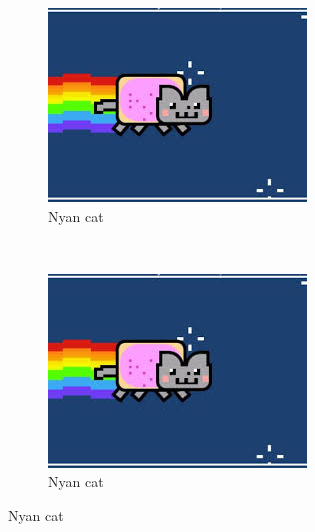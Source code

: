 \documentclass[../{{cookiecutter.project_slug}}.tex]{subfiles}
\begin{document}
    \begin{figure}
        \centering
        \begin{subfigure}[b]{0.3\textwidth}
            \includegraphics[width=\textwidth]{images/cat.jpeg}
            \caption{Nyan cat}
            \label{fig:cat1}
        \end{subfigure}%
        ~ %
        \begin{subfigure}[b]{0.3\textwidth}
            \includegraphics[width=\textwidth]{images/cat.jpeg}
            \caption{Nyan cat}
            \label{fig:cat2} 
        \end{subfigure}

\end{figure}
\end{document}
